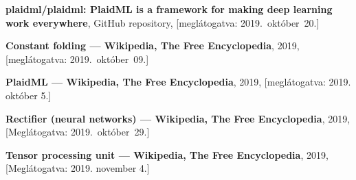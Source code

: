 \begin{thebibliography}{9}
	\textbf{plaidml/plaidml: PlaidML is a framework for making deep learning work everywhere},
	GitHub repository,
	[meglátogatva: 2019.~október~20.]


	\textbf{Constant folding --- {Wikipedia}{,} The Free Encyclopedia},
	2019,
	[meglátogatva: 2019.~október~09.]
	
	\textbf{PlaidML --- {Wikipedia}{,} The Free Encyclopedia},
	2019,
	[meglátogatva: 2019. október 5.]
	
	\textbf{Rectifier (neural networks) --- {Wikipedia}{,} The Free Encyclopedia},
	2019,
	[Meglátogatva: 2019.~október~29.]
	
	\textbf{Tensor processing unit --- {Wikipedia}{,} The Free Encyclopedia},
	2019,
	[Meglátogatva: 2019. november 4.]

\end{thebibliography}